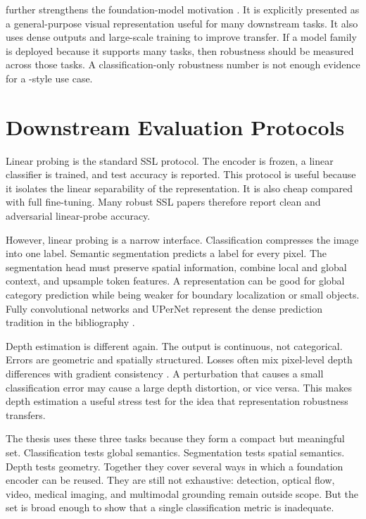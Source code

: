 \DINOv further strengthens the foundation-model motivation \parencite{oquab2024dinov2}. It is explicitly presented as a general-purpose visual representation useful for many downstream tasks. It also uses dense outputs and large-scale training to improve transfer. If a model family is deployed because it supports many tasks, then robustness should be measured across those tasks. A classification-only robustness number is not enough evidence for a \DINOv-style use case.

\section{Downstream Evaluation Protocols}

Linear probing is the standard SSL protocol. The encoder is frozen, a linear classifier is trained, and test accuracy is reported. This protocol is useful because it isolates the linear separability of the representation. It is also cheap compared with full fine-tuning. Many robust SSL papers therefore report clean and adversarial linear-probe accuracy.

However, linear probing is a narrow interface. Classification compresses the image into one label. Semantic segmentation predicts a label for every pixel. The segmentation head must preserve spatial information, combine local and global context, and upsample token features. A representation can be good for global category prediction while being weaker for boundary localization or small objects. Fully convolutional networks and UPerNet represent the dense prediction tradition in the bibliography \parencite{long2017segmentation,xiao2018unified}.

Depth estimation is different again. The output is continuous, not categorical. Errors are geometric and spatially structured. Losses often mix pixel-level depth differences with gradient consistency \parencite{godard2019depthestimation,MegaDepthLi18,AdaBins}. A perturbation that causes a small classification error may cause a large depth distortion, or vice versa. This makes depth estimation a useful stress test for the idea that representation robustness transfers.

The thesis uses these three tasks because they form a compact but meaningful set. Classification tests global semantics. Segmentation tests spatial semantics. Depth tests geometry. Together they cover several ways in which a foundation encoder can be reused. They are still not exhaustive: detection, optical flow, video, medical imaging, and multimodal grounding remain outside scope. But the set is broad enough to show that a single classification metric is inadequate.

